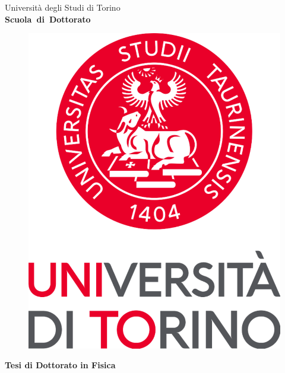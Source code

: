 \begin{titlepage}
\thispagestyle{empty}

\begin{center}

\begin{large}
Universit\`a degli Studi di Torino \\
\textbf{Scuola~di~Dottorato}
\end{large}

\hrulefill

\large{\strut}

\vspace{0.5cm}
\begin{figure}[h]
  \centering
  \includegraphics[width=.2\textheight]{Figures/logoUniversita.pdf}
\end{figure}

\vspace{1cm}

\Large{\textbf{Tesi di Dottorato in Fisica}}

\vspace{1cm}

\LARGE{\textbf{\thetitle}}\\

\vspace{1.5cm}

\Large{\textbf{\theauthor}}

\vspace*{\fill}

\end{center}
\end{titlepage}
